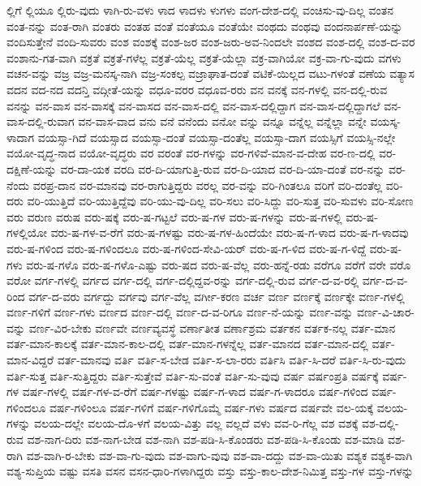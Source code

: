 {ಲ್ಲಿಗೆ
ಲ್ಲಿಯೂ
ಲ್ಲಿರು-ವುದು
ಳಾಗಿ-ರು-ವಳು
ಳಾದ
ಳಾದಳು
ಳುಗಳು
ವಂಗ-ದೇಶ-ದಲ್ಲಿ
ವಂಚಿಸು-ವು-ದಿಲ್ಲ
ವಂತನ
ವಂತ-ನನ್ನು
ವಂತ-ರಾಗಿ
ವಂತರು
ವಂತಹ
ವಂತೆ
ವಂತೆಯೂ
ವಂತೆಯೇ
ವಂಥದು
ವಂಥವು
ವಂದನಾರ್ಪಣೆ-ಯನ್ನು
ವಂದಿಸುತ್ತೇನೆ
ವಂದಿ-ಸುವರು
ವಂಶ
ವಂಶಕ್ಕೆ
ವಂಶ-ಜರ
ವಂಶ-ಜರು-ಅವ-ನಿಂದಲೇ
ವಂಶದ
ವಂಶ-ದಲ್ಲಿ
ವಂಶ-ದ-ವರ
ವಂಶಾನು-ಗತ-ವಾಗಿ
ವಕ್ರತೆ
ವಕ್ರತೆ-ಗಳೆಲ್ಲ
ವಕ್ರತೆ-ಯೆಲ್ಲ
ವಕ್ರತೆ-ಯೆಲ್ಲಾ
ವಕ್ರ-ವಾಗಿಯೋ
ವಕ್ರ-ವಾ-ಗು-ವುದು
ವಗಳು
ವಚನ-ವನ್ನು
ವಜ್ರ
ವಜ್ರ-ಮನಸ್ಕ-ನಾಗಿ
ವಜ್ರ-ಸಂಕಲ್ಪ
ವಜ್ರಾಘಾತ-ದಂತೆ
ವಟಿಕೆ-ಯಿಲ್ಲದ
ವಟು-ಗಳಂತೆ
ವಣೆಯ
ವತ್ಯಾಸ
ವದನ
ವದ-ನದ
ವದನ್ತಿ
ವದ್ಗೀತೆ-ಯನ್ನು
ವಧೂ-ವರರ
ವಧೂವ-ರರು
ವನ
ವನಕ್ಕೆ
ವನ-ಗಳಲ್ಲಿ
ವನ-ದಲ್ಲಿ-ರುವ
ವನನ್ನು
ವನ-ವಾಸ
ವನ-ವಾಸಕ್ಕೆ
ವನ-ವಾಸದ
ವನ-ವಾಸ-ದಲ್ಲಿ
ವನ-ವಾಸ-ದಲ್ಲಿದ್ದಾಗ
ವನ-ವಾಸ-ದಲ್ಲಿದ್ದಾಗಲೆ
ವನ-ವಾಸ-ದಲ್ಲಿ-ರುವಾಗ
ವನ-ವಾಸ-ವಾದ
ವನು
ವನೆ
ವನೆಂದು
ವನೋ
ವನ್ನು
ವನ್ನೂ
ವನ್ನೆಲ್ಲ
ವನ್ನೆಲ್ಲಾ
ವನ್ನೇ
ವಯಸ್ಕ-ಳಾದಾಗ
ವಯಸ್ಸಾ-ಗಿದೆ
ವಯಸ್ಸಾದ
ವಯಸ್ಸಾ-ದಂತೆ
ವಯಸ್ಸಾ-ದಂತೆಲ್ಲ
ವಯಸ್ಸಾ-ದಾಗ
ವಯಸ್ಸಿಗೆ
ವಯಸ್ಸಿ-ನಲ್ಲೇ
ವಯೋ-ವೃದ್ಧ-ನಾದ
ವಯೋ-ವೃದ್ಧರು
ವರ
ವರಂತೆ
ವರ-ಗಳನ್ನು
ವರ-ಗಳಿವೆ-ಮಾನ-ವ-ದೇಹ
ವರ-ಣ-ದಲ್ಲಿ
ವರ-ದಕ್ಷಿಣೆ-ಯನ್ನು
ವರ-ದಾ-ಯಕ
ವರದಿ
ವರ-ದಿ-ಯಾಗುತ್ತಿ-ರುವ
ವರ-ದಿ-ಯಾದ
ವರ-ದಿ-ಯಾ-ದಂತೆ
ವರ-ನನ್ನು
ವರ-ನೆಂದು
ವರಪ್ರ-ದಾನ
ವರ-ಮಾನವು
ವರ-ರಾಗುತ್ತಿದ್ದರು
ವರಲ್ಲ
ವರ-ವನ್ನು
ವರಿ-ಗಿಂತಲೂ
ವರಿಗೆ
ವರಿ-ದಂತೆಲ್ಲ
ವರಿ-ದರು
ವರಿ-ಯುತ್ತಿದೆ
ವರಿ-ಯುತ್ತಿದ್ದೆವು
ವರಿ-ಯು-ವು-ದಿಲ್ಲ
ವರಿ-ಸಲು
ವರಿ-ಸಿದ್ದು
ವರಿ-ಸುತ್ತ
ವರಿ-ಸುವಳು
ವರಿ-ಸೋಣ
ವರು
ವರುಣ
ವರುಷ
ವರು-ಷಕ್ಕೆ
ವರು-ಷ-ಗಟ್ಟಲೆ
ವರು-ಷ-ಗಳ
ವರು-ಷ-ಗಳನ್ನು
ವರು-ಷ-ಗಳಲ್ಲಿ
ವರು-ಷ-ಗಳಲ್ಲಿಯೋ
ವರು-ಷ-ಗಳ-ವ-ರೆಗೆ
ವರು-ಷ-ಗಳಷ್ಟು
ವರು-ಷ-ಗಳ-ಹಿಂದೆಯೇ
ವರು-ಷ-ಗ-ಳಾದ
ವರು-ಷ-ಗ-ಳಾದವು
ವರು-ಷ-ಗಳಿಂದ
ವರು-ಷ-ಗಳಿಂದಲೂ
ವರು-ಷ-ಗಳಿಂದ-ಸೇವಿ-ಯರ್
ವರು-ಷ-ಗ-ಳಿದ
ವರು-ಷ-ಗ-ಳಿದ್ದೆ
ವರು-ಷ-ಗಳು
ವರು-ಷ-ಗಳೊ
ವರು-ಷ-ಗಳೊ-ಎಷ್ಟು
ವರು-ಷದ
ವರು-ಷ-ವೆಲ್ಲ
ವರು-ಹನ್ನೆ-ರಡು
ವರೆಗೂ
ವರೆಗೆ
ವರೇ
ವರೊ
ವರೋ
ವರ್ಗ-ಗಳಲ್ಲಿ
ವರ್ಗದ
ವರ್ಗ-ದಲ್ಲಿ
ವರ್ಗ-ದಲ್ಲಿದ್ದವ-ರನ್ನು
ವರ್ಗ-ದಲ್ಲಿ-ರುವ
ವರ್ಗ-ದ-ವ-ರಲ್ಲಿ
ವರ್ಗ-ದ-ವ-ರಿಂದ
ವರ್ಗ-ದ-ವರು
ವರ್ಗದ್ದು
ವರ್ಗವು
ವರ್ಗ-ವೆಲ್ಲ
ವರ್ಗೀ-ಕರಣ
ವರ್ಚ
ವರ್ಣ
ವರ್ಣಕ್ಕೆ
ವರ್ಣಕ್ಕೇ
ವರ್ಣ-ಗಳಲ್ಲಿ
ವರ್ಣ-ಗಳಿಗೆ
ವರ್ಣ-ಗಳು
ವರ್ಣದ
ವರ್ಣ-ದಲ್ಲಿ
ವರ್ಣ-ದ-ವ-ರಿಗೂ
ವರ್ಣ-ನೆ-ಯನ್ನು
ವರ್ಣ-ವನ್ನು
ವರ್ಣ-ವಿ-ಚಾರ-ವನ್ನು
ವರ್ಣ-ವಿರ-ಬೇಕು
ವರ್ಣವೇ
ವರ್ಣವ್ಯವಸ್ಥೆ
ವರ್ಣಾತೀತ
ವರ್ಣಾಶ್ರಮ
ವರ್ತಕನ
ವರ್ತಕ-ನಲ್ಲ
ವರ್ತ-ಮಾನ
ವರ್ತ-ಮಾನ-ಕಾಲಕ್ಕೆ
ವರ್ತ-ಮಾನ-ಕಾಲ-ದಲ್ಲಿ
ವರ್ತ-ಮಾನ-ಗಳನ್ನೆಲ್ಲ
ವರ್ತ-ಮಾನದ
ವರ್ತ-ಮಾನ-ದಲ್ಲಿ
ವರ್ತ-ಮಾನ-ವಿದ್ದರೆ
ವರ್ತ-ಮಾನವು
ವರ್ತಿ
ವರ್ತಿ-ಸ-ಬೇಡ
ವರ್ತಿ-ಸ-ಲಾ-ರರು
ವರ್ತಿಸಿ
ವರ್ತಿ-ಸಿ-ದರೆ
ವರ್ತಿ-ಸಿ-ರು-ವುದು
ವರ್ತಿ-ಸುತ್ತ
ವರ್ತಿ-ಸುತ್ತಿದ್ದರು
ವರ್ತಿ-ಸುತ್ತೇವೆ
ವರ್ತಿ-ಸು-ವಂತೆ
ವರ್ತಿ-ಸು-ವುವು
ವರ್ಷ
ವರ್ಷಂಪ್ರತಿ
ವರ್ಷಕ್ಕೆ
ವರ್ಷ-ಗಳ
ವರ್ಷ-ಗಳಲ್ಲಿ
ವರ್ಷ-ಗಳ-ವ-ರೆಗೆ
ವರ್ಷ-ಗಳಷ್ಟು
ವರ್ಷ-ಗ-ಳಾದ
ವರ್ಷ-ಗ-ಳಾದರೂ
ವರ್ಷ-ಗಳಿಂದ
ವರ್ಷ-ಗಳಿಂದಲೂ
ವರ್ಷ-ಗಳಿಂಲೂ
ವರ್ಷ-ಗಳಿಗೆ
ವರ್ಷ-ಗಳಿಗೊಮ್ಮೆ
ವರ್ಷ-ಗಳು
ವರ್ಷದ
ವರ್ಷವೇ
ವಲ-ಯಕ್ಕೆ
ವಲಯ-ಗಳನ್ನು
ವಲಯ-ದಲ್ಲೇ
ವಲಯ-ದೊ-ಳಗೆ
ವಲಯ-ವಿತ್ತು
ವಲ್ಲ
ವಲ್ಲದೆ
ವಳು
ವವ-ರಿ-ಗೆಲ್ಲ
ವಶ
ವಶಕ್ಕೆ
ವಶ-ದಲ್ಲಿ-ರುವ
ವಶ-ನಾಗ-ದಿರು
ವಶ-ನಾಗ-ಬೇಡ
ವಶ-ನಾಗಿ
ವಶ-ಪಡಿ-ಸಿ-ಕೊಂಡರು
ವಶ-ಪಡಿ-ಸಿ-ಕೊಂಡು
ವಶ-ಮಾಡಿ
ವಶ-ರಾಗಿ
ವಶ-ವಾಗಿ-ರ-ಬೇಕು
ವಶ-ವಾ-ಗು-ವುದು
ವಶ-ವಾಗು-ವುವು
ವಶ-ವಾ-ದದ್ದು
ವಶ-ವಾ-ಯಿತು
ವಶ್ಯಕ
ವಶ್ಯಕ-ವಾಗಿ
ವಶ್ಯ-ಸುಪ್ತಿಯ
ವಷ್ಟು
ವಸತಿ
ವಸನ
ವಸನ-ಧಾರಿ-ಗಳಾಗಿದ್ದರು
ವಸ್ತು
ವಸ್ತು-ಕಾಲ-ದೇಶ-ನಿಮಿತ್ತ
ವಸ್ತು-ಗಳ
ವಸ್ತು-ಗಳನ್ನು
}
